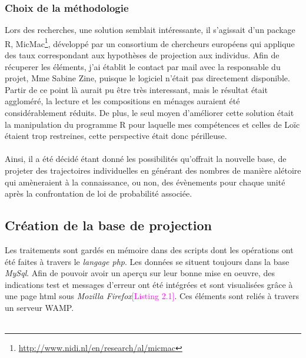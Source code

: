 \documentclass{bredele}
\begin{document}
\subsubsection{Choix de la méthodologie}
Lors des recherches, une solution semblait intéressante, il s'agissait d'un package R, MicMac\footnote{\href{Mic-Mac project}{http://www.nidi.nl/en/research/al/micmac}}, développé par un  consortium de chercheurs européens qui applique des taux correspondant aux hypothèses de projection aux individus. Afin de récuperer les éléments, j'ai établit le contact par mail avec la responsable du projet, Mme Sabine Zine, puisque le logiciel n'était pas directement disponible. Partir de ce point là aurait pu être très interessant, mais le résultat était aggloméré, la lecture et les compositions en ménages auraient été considérablement réduits. De plus, le seul moyen d'améliorer cette solution était la manipulation du programme R pour laquelle mes compétences et celles de Loïc étaient trop restreines, cette perspective était donc périlleuse.
\\\\Ainsi, il a été décidé étant donné les possibilités qu'offrait la nouvelle base, de projeter des trajectoires individuelles en générant des nombres de manière alétoire qui amèneraient à la connaissance, ou non, des évènements pour chaque unité après la confrontation de loi de probabilité associée.
\newline
\subsection{Création de la base de projection}
Les traitements sont gardés en mémoire dans des scripts dont les opérations ont été faites à travers le \textit{langage php}. Les données se situent toujours dans la base \textit{MySql}. Afin de pouvoir avoir un aperçu sur leur bonne mise en oeuvre, des indications test et messages d'erreur ont été intégrées et sont visualisées grâce à une page html sous \textit{Mozilla Firefox}\textcolor{magenta}{[Listing 2.1]}. Ces éléments sont reliés à travers un serveur WAMP.\\\\
\newpage
\end{document}

